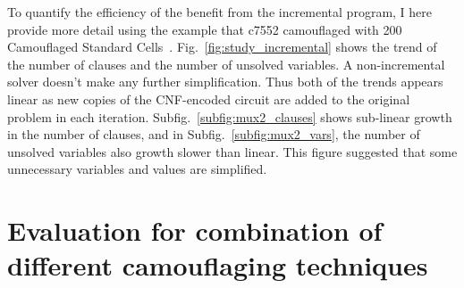 \documentclass[thesis]{umassthesis}  %
\begin{document}
To quantify the efficiency of the benefit from the incremental program, I here provide more detail using the example that c7552 camouflaged with 200 Camouflaged Standard Cells~\cite{rajendran-13}.  Fig.~\ref{fig:study_incremental} shows the trend of the number of clauses and the number of unsolved variables. A non-incremental solver doesn't make any further simplification. Thus both of the trends appears linear as new copies of the CNF-encoded circuit are added to the original problem in each iteration. Subfig.~\ref{subfig:mux2_clauses} shows sub-linear growth in the number of clauses, and in Subfig.~\ref{subfig:mux2_vars}, the number of unsolved variables also growth slower than linear. This figure suggested that some unnecessary variables and values are simplified.






\section{Evaluation for combination of different camouflaging techniques}
\end{document}
